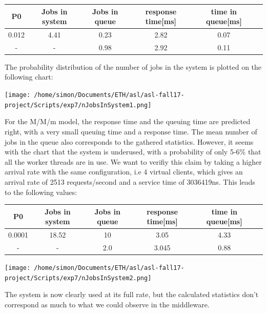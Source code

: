 \documentclass[11pt,a4paper]{article}
\begin{document}
\begin{center}

		\begin{tabular}{|c|c|c|c|c|c|}
			  \hline
			  \textbf{P0} & \textbf{Jobs in system} & \textbf{Jobs in queue} & \textbf{response time[ms]} & \textbf{time in queue[ms]}\\
			  \hline
			  0.012  & 4.41 & 0.23 & 2.82 & 0.07 \\
			   - & - & 0.98  & 2.92 & 0.11 \\
			  \hline
		\end{tabular}
 
\end{center}
The probability distribution of the number of jobs in the system is plotted on the following chart: 
\begin{center} 
\texttt{[image: /home/simon/Documents/ETH/asl/asl-fall17-project/Scripts/exp7/nJobsInSystem1.png]}
\end{center} 
For the M/M/m model, the response time and the queuing time are predicted right, with a very small queuing time and a response time. The mean number of jobs in the queue also corresponds to the gathered statistics. However, it seems with the chart that the system is underused, with a probability of only 5-6\% that all the worker threads are in use. We want to verifiy this claim by taking a higher arrival rate with the same configuration, i.e 4 virtual clients, which gives an arrival rate of 2513 requests/second and a service time of 3036419ns. 
This leads to the following values:
 \begin{center}

		\begin{tabular}{|c|c|c|c|c|c|}
			  \hline
			  \textbf{P0} & \textbf{Jobs in system} & \textbf{Jobs in queue} & \textbf{response time[ms]} & \textbf{time in queue[ms]}\\
			  \hline
			  0.0001  & 18.52 & 10 & 3.05 & 4.33 \\
			  - & - & 2.0  & 3.045 & 0.88 \\
			  \hline
		\end{tabular}
 
\end{center} 
\begin{center} 
\texttt{[image: /home/simon/Documents/ETH/asl/asl-fall17-project/Scripts/exp7/nJobsInSystem2.png]}
\end{center} 
The system is now clearly used at its full rate, but the calculated statistics don't correspond as much to what we could observe in the middleware.
\end{document}
